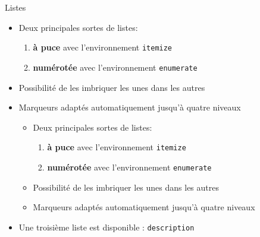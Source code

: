 \begin{frame}[fragile]{Listes}
	\begin{itemize}
		\item Deux principales sortes de listes:
		\begin{enumerate}
			\item \textbf{à puce} avec l'environnement \texttt{itemize}
			\item \textbf{numérotée} avec l'environnement \texttt{enumerate}
		\end{enumerate}
		\item Possibilité de les imbriquer les unes dans les autres
		\item Marqueurs adaptés automatiquement jusqu'à quatre niveaux

		\pause
\begin{codesource}
	\begin{itemize}
		\item Deux principales sortes de listes:
		\begin{enumerate}
			\item \textbf{à puce} avec l'environnement \verb=itemize=
			\item \textbf{numérotée} avec l'environnement \verb=enumerate=
		\end{enumerate}
		\item Possibilité de les imbriquer les unes dans les autres
		\item Marqueurs adaptés automatiquement jusqu'à quatre niveaux
	\end{itemize}
\end{codesource}

		\pause
		\item Une troisième liste est disponible : \texttt{description}
	\end{itemize}
\end{frame}

